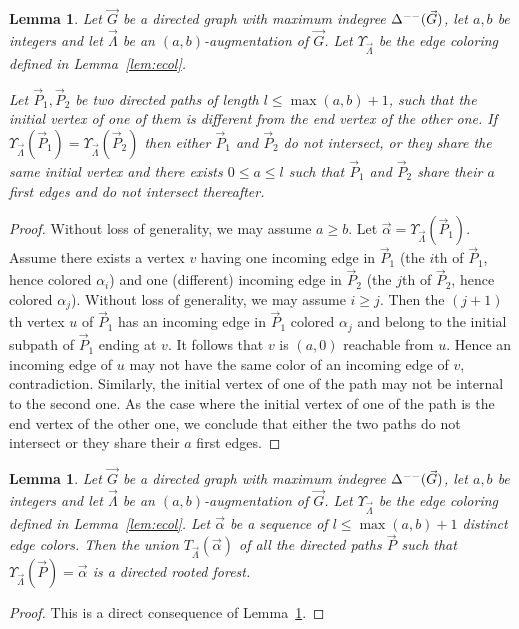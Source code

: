 \documentclass[a4paper]{amsart}
\newtheorem{lemma}[theorem]{Lemma}
\theoremstyle{definition}
\theoremstyle{remark}
\newcommand\ecol[1]{\Upsilon_{#1}}
\DeclareMathOperator\md{\Delta^{\rm --}}
\def\vG{\vec{G}}
\def\vP{\vec{P}}
\def\vL{\vec{\Lambda}}
\begin{document}
\begin{lemma}
  \label{lem:tree0}
  Let $\vG$ be a directed graph with maximum indegree $\md(\vG)$, let
  $a,b$ be integers and let $\vL$ be an $(a,b)$-augmentation of
  $\vG$. Let $\ecol{\vL}$ be the edge coloring defined in
  Lemma~\ref{lem:ecol}. 

  Let $\vP_1,\vP_2$ be two directed paths of length
  $l\leq\max(a,b)+1$, such that the initial vertex of one of them is
  different from the end vertex of the other one.
  If $\ecol{\vL}(\vP_1)=\ecol{\vL}(\vP_2)$ then 
  either $\vP_1$ and $\vP_2$ do
  not intersect, or they share the same initial vertex and 
  there exists $0\leq a\leq l$ such that $\vP_1$ and
  $\vP_2$ share their $a$ first edges and do not intersect
  thereafter.
\end{lemma}
\begin{proof}
Without loss of generality, we may assume $a\geq b$. 
Let $\vec{\alpha}=\ecol{\vL}(\vP_1)$.
Assume there exists a vertex $v$ having one incoming edge in $\vP_1$
(the $i$th of $\vP_1$, hence colored $\alpha_i$) and one
(different) incoming edge in $\vP_2$ (the $j$th of $\vP_2$, hence
colored $\alpha_j$). Without loss of generality, we may assume $i\geq
j$. 
Then the $(j+1)$th vertex $u$ of $\vP_1$ has an incoming edge in
$\vP_1$ colored $\alpha_j$ and belong to the initial subpath of
$\vP_1$ ending at $v$. It follows that $v$ is $(a,0)$ reachable from
$u$. Hence an incoming edge of $u$ may not have the same color of an
incoming edge of $v$, contradiction.
Similarly, the initial vertex of one of the path may not be internal
to the second one.
As the case where the initial vertex of one of the path is the end
vertex of the other one, we conclude that either the two paths do not
intersect or they share their $a$ first edges.
\end{proof}
\begin{lemma}
  \label{lem:tree}
  Let $\vG$ be a directed graph with maximum indegree $\md(\vG)$, let
  $a,b$ be integers and let $\vL$ be an $(a,b)$-augmentation of
  $\vG$. Let $\ecol{\vL}$ be the edge coloring defined in
  Lemma~\ref{lem:ecol}. Let $\vec{\alpha}$ be a sequence of 
  $l\leq \max(a,b)+1$ distinct edge colors. Then the union
  $T_{\vL}(\vec{\alpha})$ of all the directed paths $\vP$ such that
  $\ecol{\vL}(\vP)=\vec{\alpha}$ is a directed rooted forest.
\end{lemma}
\begin{proof}
This is a direct consequence of Lemma~\ref{lem:tree0}.
\end{proof}
\end{document}
